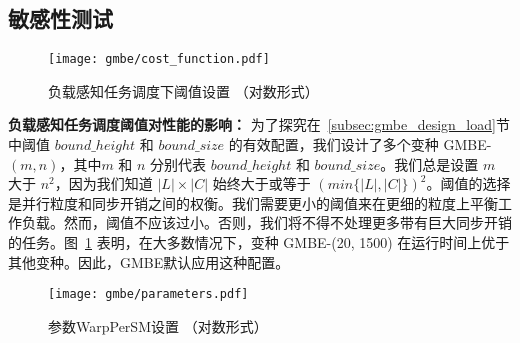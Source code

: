 


\subsection{敏感性测试}
\label{subsec:gmbe_sensitivity}


\begin{figure} [H]
	\centering
  \vspace{0.1in}
	\texttt{[image: gmbe/cost\_function.pdf]}	
	\vspace{0.1in}
  \caption{负载感知任务调度下阈值设置 （对数形式）}
	\label{fig:gmbe_exp_cost}
\end{figure}


\textbf{负载感知任务调度阈值对性能的影响：} 为了探究在~\ref{subsec:gmbe_design_load}节中阈值 $bound\_height$ 和 $bound\_size$ 的有效配置，我们设计了多个变种 GMBE-$(m, n)$，其中$m$ 和 $n$ 分别代表 $bound\_height$ 和 $bound\_size$。我们总是设置 $m$ 大于 $n^2$，因为我们知道  $|L|\times|C|$ 始终大于或等于 $(min\{|L|,|C|\})^2$。阈值的选择是并行粒度和同步开销之间的权衡。我们需要更小的阈值来在更细的粒度上平衡工作负载。然而，阈值不应该过小。否则，我们将不得不处理更多带有巨大同步开销的任务。图~\ref{fig:gmbe_exp_cost} 表明，在大多数情况下，变种 GMBE-(20, 1500) 在运行时间上优于其他变种。因此，GMBE默认应用这种配置。


\begin{figure} [H]
	\centering
  \vspace{0.1in}
	\texttt{[image: gmbe/parameters.pdf]}	
	\vspace{0.1in}
  \caption{参数\textsf{WarpPerSM}设置 （对数形式）}
	\label{fig:gmbe_exp_config}
\end{figure}

